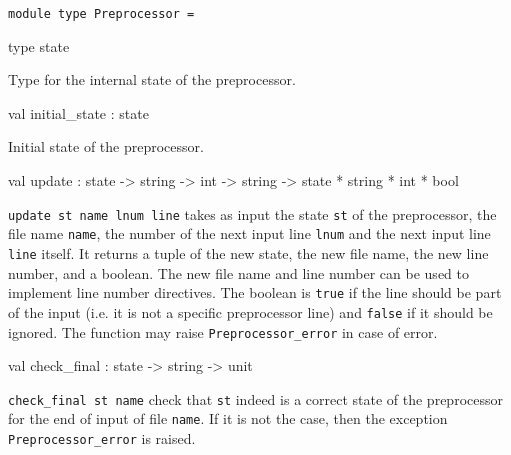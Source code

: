 \documentclass[11pt]{article}
\begin{document}
\begin{ocamldoccode}
{\tt{module type }}{\tt{Preprocessor}}{\tt{ = }}\end{ocamldoccode}
\label{moduletype:Input.Preprocessor}

\begin{ocamldocsigend}


\label{type:Input.Preprocessor.state}\begin{ocamldoccode}
type state 
\end{ocamldoccode}
\begin{ocamldocdescription}
Type for the internal state of the preprocessor.


\end{ocamldocdescription}


\label{val:Input.Preprocessor.initial-underscorestate}\begin{ocamldoccode}
val initial_state : state
\end{ocamldoccode}
\begin{ocamldocdescription}
Initial state of the preprocessor.


\end{ocamldocdescription}


\label{val:Input.Preprocessor.update}\begin{ocamldoccode}
val update :
  state ->
  string -> int -> string -> state * string * int * bool
\end{ocamldoccode}
\begin{ocamldocdescription}
{\tt{update st name lnum line}} takes as input the state {\tt{st}} of  the
        preprocessor, the file name {\tt{name}}, the number of the next input
        line {\tt{lnum}} and the next input line {\tt{line}} itself. It returns  a
        tuple of the new state, the new file name, the new line  number,
        and a boolean. The new file name and line number can be used  to
        implement line number directives. The boolean is {\tt{true}}  if  the
        line should be part of the input (i.e.  it  is  not  a  specific
        preprocessor line) and {\tt{false}} if  it  should  be  ignored.  The
        function may raise {\tt{Preprocessor\_error}} in case of error.


\end{ocamldocdescription}


\label{val:Input.Preprocessor.check-underscorefinal}\begin{ocamldoccode}
val check_final : state -> string -> unit
\end{ocamldoccode}
\begin{ocamldocdescription}
{\tt{check\_final st name}} check that {\tt{st}} indeed is a correct  state
        of the preprocessor for the end of input of file {\tt{name}}.  If  it
        is not the  case, then  the  exception  {\tt{Preprocessor\_error}}  is
        raised.


\end{ocamldocdescription}
\end{ocamldocsigend}
\end{document}
